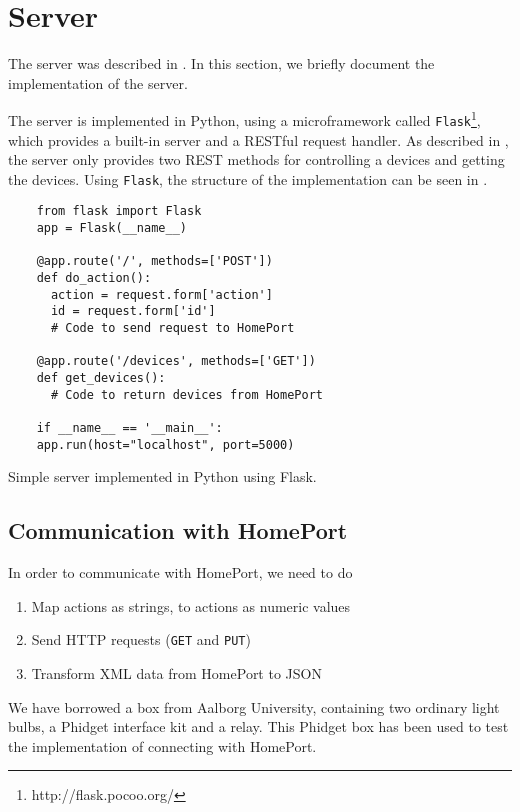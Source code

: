 \section{Server}\label{sec:serverimplementation}
The server was described in . 
In this section, we briefly document the implementation of the server.

The server is implemented in Python,
using a microframework called \texttt{Flask}\footnote{http://flask.pocoo.org/},
which provides a built-in server and a RESTful request handler. 
As described in , 
the server only provides two REST methods for controlling a devices and getting the devices. 
Using \texttt{Flask}, the structure of the implementation can be seen in .

\begin{listing}
  \begin{verbatim}
    from flask import Flask
    app = Flask(__name__)
    
    @app.route('/', methods=['POST'])
    def do_action():
      action = request.form['action']
      id = request.form['id']
      # Code to send request to HomePort
      
    @app.route('/devices', methods=['GET'])
    def get_devices():
      # Code to return devices from HomePort
    
    if __name__ == '__main__':
    app.run(host="localhost", port=5000)
  \end{verbatim}
  \caption{Simple server implemented in Python using Flask.}
  \label{lst:server}
\end{listing}

\subsection{Communication with HomePort}
In order to communicate with HomePort, 
we need to do
\begin{enumerate}
  \item Map actions as strings, to actions as numeric values
  \item Send HTTP requests (\texttt{GET} and \texttt{PUT})
  \item Transform XML data from HomePort to JSON
\end{enumerate}

We have borrowed a box from Aalborg University,
containing two ordinary light bulbs, 
a Phidget interface kit and a relay.
This Phidget box has been used to test the implementation of connecting with HomePort. 

